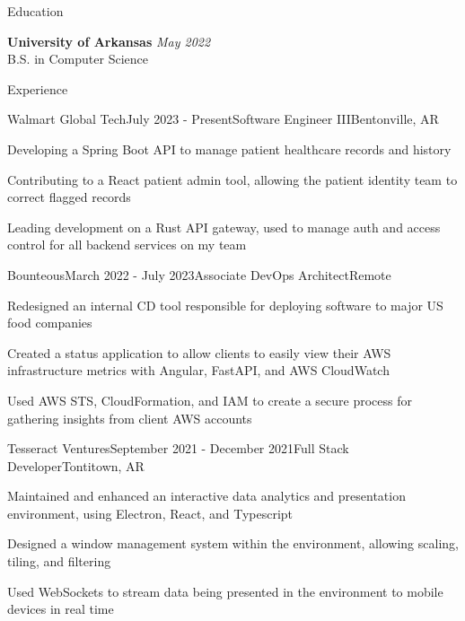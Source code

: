 \documentclass[
	11pt, %
]{resume} %
\begin{document}

\begin{rSection}{Education}

	\textbf{University of Arkansas} \hfill \textit{May 2022} \\
	B.S. in Computer Science

\end{rSection}


\begin{rSection}{Experience}

	\begin{rSubsection}{Walmart Global Tech}{July 2023 - Present}{Software Engineer III}{Bentonville, AR}
		\item Developing a Spring Boot API to manage patient healthcare records and history
		\item Contributing to a React patient admin tool, allowing the patient identity team to correct flagged records
		\item Leading development on a Rust API gateway, used to manage auth and access control for all backend services on my team
	\end{rSubsection}


	\begin{rSubsection}{Bounteous}{March 2022 - July 2023}{Associate DevOps Architect}{Remote}
		\item Redesigned an internal CD tool responsible for deploying software to major US food companies
		\item Created a status application to allow clients to easily view their AWS infrastructure metrics with Angular, FastAPI, and AWS CloudWatch
		\item Used AWS STS, CloudFormation, and IAM to create a secure process for gathering insights from client AWS accounts
	\end{rSubsection}


	\begin{rSubsection}{Tesseract Ventures}{September 2021 - December 2021}{Full Stack Developer}{Tontitown, AR}
		\item Maintained and enhanced an interactive data analytics and presentation environment, using Electron, React, and Typescript
		\item Designed a window management system within the environment, allowing scaling, tiling, and filtering
		\item Used WebSockets to stream data being presented in the environment to mobile devices in real time
	\end{rSubsection}

\end{rSection}
\end{document}
